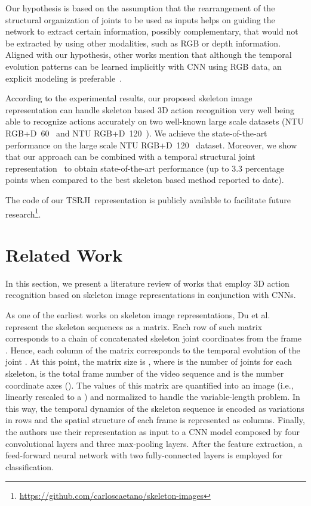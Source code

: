 \documentclass[10pt,conference]{IEEEtran}
\def\sigla{TSRJI}
\begin{document}
Our hypothesis is based on the assumption that the rearrangement of the structural organization of joints to be used as inputs helps on guiding the network to extract certain information, possibly complementary, that would not be extracted by using other modalities, such as RGB or depth information. Aligned with our hypothesis, other works mention that although the temporal evolution patterns can be learned implicitly with CNN using RGB data, an explicit modeling is preferable~\cite{Li:2018}.

According to the experimental results, our proposed skeleton image representation can handle skeleton based 3D action recognition very well being able to recognize actions accurately on two well-known large scale datasets (NTU RGB+D~60~\cite{Shahroudy:2016} and NTU RGB+D~120~\cite{Liu:2019}). We achieve the state-of-the-art performance on the large scale NTU RGB+D~120~\cite{Liu:2019} dataset. Moreover, we show that our approach can be combined with a temporal structural joint representation~\cite{Li:2018} to obtain state-of-the-art performance (up to 3.3 percentage points when compared to the best skeleton based method reported to date).

The code of our \sigla~representation is publicly available to facilitate future research\footnote{\url{https://github.com/carloscaetano/skeleton-images}}.



\section{Related Work}\label{related}

In this section, we present a literature review of works that employ 3D action recognition based on skeleton image representations in conjunction with CNNs.

As one of the earliest works on skeleton image representations, Du et al.~\cite{Du:2015} represent the skeleton sequences as a matrix. Each row of such matrix corresponds to a chain of concatenated skeleton joint coordinates from the frame . Hence, each column of the matrix corresponds to the temporal evolution of the joint . At this point, the matrix size is , where  is the number of joints for each skeleton,  is the total frame number of the video sequence and  is the number coordinate axes (). The values of this matrix are quantified into an image (i.e., linearly rescaled to a ) and normalized to handle the variable-length problem. In this way, the temporal dynamics of the skeleton sequence is encoded as variations in rows and the spatial structure of each frame is represented as columns. Finally, the authors use their representation as input to a CNN model composed by four convolutional layers and three max-pooling layers. After the feature extraction, a feed-forward neural network with two fully-connected layers is employed for classification. 
\end{document}

